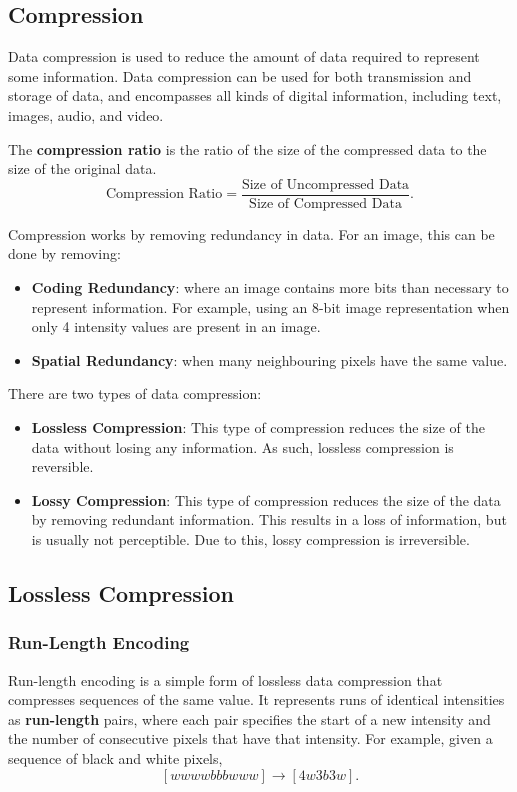 \documentclass{article}
\begin{document}
\subsection{Compression}
Data compression is used to reduce the amount of data required to
represent some information. Data compression can be used for both
transmission and storage of data, and encompasses all kinds of digital
information, including text, images, audio, and video.
\begin{definition}
    The \textbf{compression ratio} is the ratio of the size of the
    compressed data to the size of the original data.
    \begin{equation*}
        \text{Compression Ratio} = \frac{\text{Size of Uncompressed Data}}{\text{Size of Compressed Data}}.
    \end{equation*}
\end{definition}
Compression works by removing redundancy in data. For an image, this can
be done by removing:
\begin{itemize}
    \item \textbf{Coding Redundancy}: where an image contains more bits
    than necessary to represent information. For example, using an 8-bit
    image representation when only 4 intensity values are present in an
    image.
    \item \textbf{Spatial Redundancy}: when many neighbouring pixels
    have the same value.
\end{itemize}
There are two types of data compression:
\begin{itemize}
    \item \textbf{Lossless Compression}: This type of compression
          reduces the size of the data without losing any information.
          As such, lossless compression is reversible.
    \item \textbf{Lossy Compression}: This type of compression reduces
          the size of the data by removing redundant information. This
            results in a loss of information, but is usually not
            perceptible. Due to this, lossy compression is irreversible.
\end{itemize}
\subsection{Lossless Compression}
\subsubsection{Run-Length Encoding}
Run-length encoding is a simple form of lossless data compression that
compresses sequences of the same value. It represents runs of identical
intensities as \textbf{run-length} pairs, where each pair specifies the
start of a new intensity and the number of consecutive pixels that have
that intensity. For example, given a sequence of black and white pixels,
\begin{equation*}
    \left[ w w w w b b b w w w \right] \to \left[ 4w 3b 3w \right].
\end{equation*}
\end{document}
